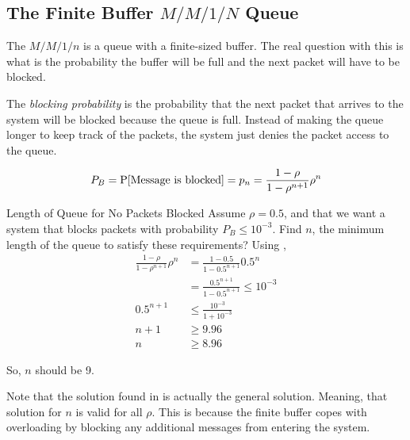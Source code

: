\subsection{\texorpdfstring{The Finite Buffer $M/M/1/N$ Queue}{Finite Buffer Queue}}\label{subsec:MM1n_Queue}
The $M/M/1/n$ is a queue with a finite-sized buffer.
The real question with this is what is the probability the buffer will be full and the next packet will have to be blocked.

\begin{definition}\label{def:Blocking_Probability-Packets}
  The \emph{blocking probability} is the probability that the next packet that arrives to the system will be blocked because the queue is full.
  Instead of making the queue longer to keep track of the packets, the system just denies the packet access to the queue.

  \begin{equation}\label{eq:Blocking_Probability-Packets}
    P_{B} = \operatorname{\operatorname{P}}[\text{Message is blocked}] = p_{n} = \frac{1-\rho}{1-\rho^{n+1}} \rho^{n}
  \end{equation}
\end{definition}

\begin{example}[Lecture 4]{Length of Queue for No Packets Blocked}
  Assume $\rho = 0.5$, and that we want a system that blocks packets with probability $P_{B} \leq 10^{-3}$.
  Find $n$, the minimum length of the queue to satisfy these requirements?
  \tcblower{}
  Using ,
  \begin{align*}
    \frac{1-\rho}{1-\rho^{n+1}} \rho^{n} &= \frac{1-0.5}{1-0.5^{n+1}} 0.5^{n} \\
                                         &= \frac{0.5^{n+1}}{1-0.5^{n+1}} \leq 10^{-3} \\
    0.5^{n+1} &\leq \frac{10^{-3}}{1 + 10^{-3}} \\
    n + 1 &\geq 9.96 \\
    n &\geq 8.96
  \end{align*}

  So, $n$ should be 9.
\end{example}

\begin{remark*}
  Note that the solution found in  is actually the general solution.
  Meaning, that solution for $n$ is valid for all $\rho$.
  This is because the finite buffer copes with overloading by blocking any additional messages from entering the system.
\end{remark*}

